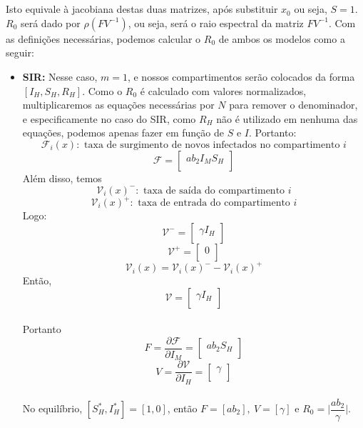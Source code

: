 \\\\
Isto equivale à jacobiana  destas duas matrizes, após substituir $x_0$ ou seja, $S=1$. $R_0$ será dado por $\rho(FV^{-1})$, ou seja, será o raio espectral da matriz $FV^{-1}$. Com as definições necessárias, podemos calcular o $R_0$ de ambos os modelos como a seguir:
\begin{itemize}
\item \textbf{SIR:}
Nesse caso, $m=1$, e nossos compartimentos serão colocados da forma $[I_H, S_H, R_H]$. Como o $R_0$ é calculado com valores normalizados, multiplicaremos as equações necessárias por $N$ para remover o denominador, e especificamente no caso do SIR, como $R_H$ não é utilizado em nenhuma das equações, podemos apenas fazer em função de $S$ e $I$. Portanto:
$$ {\mathcal F}_i(x): \text{ taxa de surgimento de novos infectados no compartimento } i $$
$$ {\mathcal F} =\begin{bmatrix}
a  b_2  I_M  S_H \\
\end{bmatrix} $$
Além disso, temos
$$ {\mathcal V}_i(x)^-: \text{ taxa de saída do compartimento } i $$
$$ {\mathcal V}_i(x)^+: \text{ taxa de entrada do compartimento } i $$
Logo:
$$
{\mathcal V^-} = \begin{bmatrix}
\gamma I_H\\
\end{bmatrix}
$$
$$
{\mathcal V^+} = \begin{bmatrix}
0\\
\end{bmatrix}
$$
$${\mathcal V}_i (x) = {\mathcal V}_i(x)^{-} - {\mathcal V}_i(x)^+$$
Então,
$$
{\mathcal V} =
\begin{bmatrix}
\gamma I_H\\
\end{bmatrix}
$$
\\
Portanto
$$ F = \dfrac{\partial{\mathcal F}}{\partial I_M} =\begin{bmatrix}
a  b_2  S_H \\
\end{bmatrix} $$
$$ V = \dfrac{\partial{\mathcal V}}{\partial I_H} =\begin{bmatrix}
\gamma \\
\end{bmatrix} $$
\\No equilíbrio, $[S_H^*, I_H^*] = [1,0]$, então $F=[a  b_2], \ V = [\gamma]$ e $R_0 = \Big | \dfrac{ab_2}{\gamma}\Big | $.


\end{itemize}
